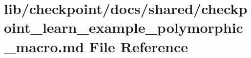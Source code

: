\hypertarget{checkpoint__learn__example__polymorphic__macro_8md}{}\section{lib/checkpoint/docs/shared/checkpoint\+\_\+learn\+\_\+example\+\_\+polymorphic\+\_\+macro.md File Reference}
\label{checkpoint__learn__example__polymorphic__macro_8md}
